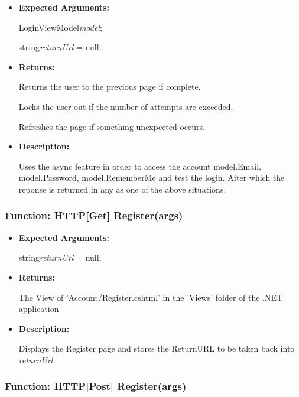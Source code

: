 \documentclass{scrreprt}
\begin{document}
\begin{itemize}
        \item \textbf{Expected Arguments:}

                LoginViewModel\quad\textit{model};

                string\quad\textit{returnUrl} = null;

        \item \textbf{Returns:}

                Returns the user to the previous page if complete.

                Locks the user out if the number of attempts are exceeded.

                Refreshes the page if something unexpected occurs.

        \item \textbf{Description:}

                Uses the async feature in order to access the account
                model.Email, model.Password, model.RememberMe and test the
                login. After which the reponse is returned in any as one of the
                above situations.

\end{itemize}


\subsubsection{Function: HTTP[Get] Register(args)}

\begin{itemize}
        \item \textbf{Expected Arguments:}

                string\quad\textit{returnUrl} = null;

        \item \textbf{Returns:}

                The View of 'Account/Register.cshtml' in the 'Views' folder of the .NET
                application

        \item \textbf{Description:}

                Displays the Register page and stores the ReturnURL to be taken back into
                \textit{returnUrl}
\end{itemize}


\subsubsection{Function: HTTP[Post] Register(args)}
\end{document}
